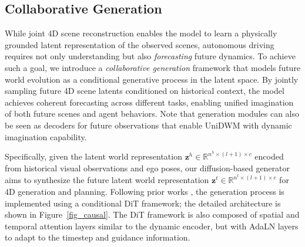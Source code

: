 \subsection{Collaborative Generation}
\label{gen}

While joint 4D scene reconstruction enables the model to learn a physically grounded latent representation of the observed scenes, autonomous driving requires not only understanding but also \emph{forecasting} future dynamics. To achieve such a goal, we introduce a \textit{collaborative generation} framework that models future world evolution as a conditional generative process in the latent space. By jointly sampling future 4D scene latents conditioned on historical context, the model achieves coherent forecasting across different tasks, enabling unified imagination of both future scenes and agent behaviors. Note that generation modules can also be seen as decoders for future observations that enable UniDWM with dynamic imagination capability. 

Specifically, given the latent world representation $\mathbf{z}^{h}\in \mathbb{R}^{n^h \times (l + 1) \times c}$ encoded from historical visual observations and ego poses, our diffusion-based generator aims to synthesize the future latent world representation $\mathbf{z}^{t} \in \mathbb{R}^{n^t \times (l + 1) \times c}$ for 4D generation and planning. Following prior works \cite{kong2024hunyuanvideo, epona}, the generation process is implemented using a conditional DiT framework; the detailed architecture is shown in Figure~\ref{fig_causal}. The DiT framework is also composed of spatial and temporal attention layers similar to the dynamic encoder, but with AdaLN layers to adapt to the timestep and guidance information. 


